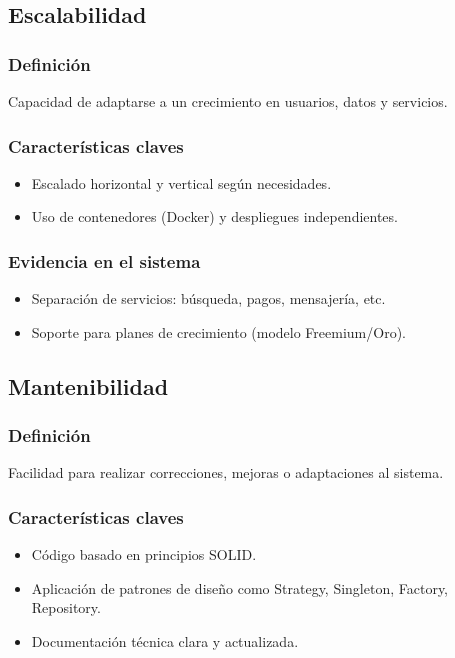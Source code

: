 	\subsection{Escalabilidad}
		\subsubsection*{Definición}
			\noindent Capacidad de adaptarse a un crecimiento en usuarios, datos y servicios.
		
		\subsubsection*{Características claves}
			\begin{itemize}
				\item Escalado horizontal y vertical según necesidades.
				\item Uso de contenedores (Docker) y despliegues independientes.
			\end{itemize}
		
		\subsubsection*{Evidencia en el sistema}
			\begin{itemize}
				\item Separación de servicios: búsqueda, pagos, mensajería, etc.
				\item Soporte para planes de crecimiento (modelo Freemium/Oro).
			\end{itemize}
	
	\subsection{Mantenibilidad}
		\subsubsection*{Definición}
			\noindent Facilidad para realizar correcciones, mejoras o adaptaciones al sistema.
		
		\subsubsection*{Características claves}
			\begin{itemize}
				\item Código basado en principios SOLID.
				\item Aplicación de patrones de diseño como Strategy, Singleton, Factory, Repository.
				\item Documentación técnica clara y actualizada.
			\end{itemize}
	
